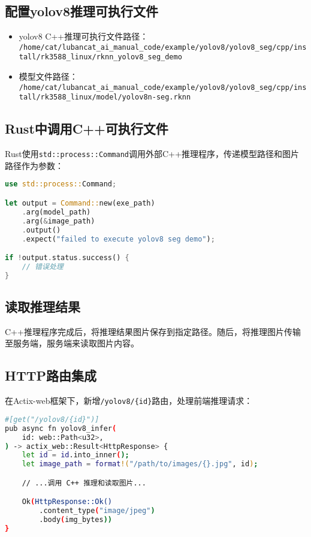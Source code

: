 \subsection{配置yolov8推理可执行文件}
\begin{itemize}
    \item yolov8 C++推理可执行文件路径：\\
    \lstinline[breaklines=true]|/home/cat/lubancat_ai_manual_code/example/yolov8/yolov8_seg/cpp/install/rk3588_linux/rknn_yolov8_seg_demo|
    \item 模型文件路径：\\
    \lstinline[breaklines=true]|/home/cat/lubancat_ai_manual_code/example/yolov8/yolov8_seg/cpp/install/rk3588_linux/model/yolov8n-seg.rknn|
\end{itemize}
\subsection{Rust中调用C++可执行文件}
Rust使用\texttt{std::process::Command}调用外部C++推理程序，传递模型路径和图片路径作为参数：
\begin{lstlisting}[language=Rust]
use std::process::Command;

let output = Command::new(exe_path)
    .arg(model_path)
    .arg(&image_path)
    .output()
    .expect("failed to execute yolov8 seg demo");

if !output.status.success() {
    // 错误处理
}
\end{lstlisting}

\subsection{读取推理结果}

C++推理程序完成后，将推理结果图片保存到指定路径。随后，将推理图片传输至服务端，服务端来读取图片内容。
\subsection{HTTP路由集成}

在Actix-web框架下，新增\texttt{/yolov8/\{id\}}路由，处理前端推理请求：

\begin{lstlisting}[language=bash, breaklines=true]
#[get("/yolov8/{id}")]
pub async fn yolov8_infer(
    id: web::Path<u32>,
) -> actix_web::Result<HttpResponse> {
    let id = id.into_inner();
    let image_path = format!("/path/to/images/{}.jpg", id);

    // ...调用 C++ 推理和读取图片...

    Ok(HttpResponse::Ok()
        .content_type("image/jpeg")
        .body(img_bytes))
}
\end{lstlisting}

